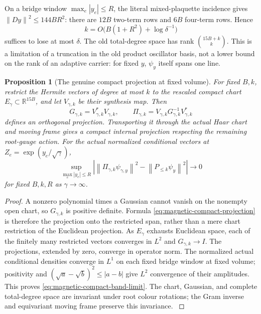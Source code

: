 \documentclass[11pt,oneside,openany]{book}
\newtheorem{proposition}[proposition]{Proposition}
\theoremstyle{definition}
\theoremstyle{remark}
\newcommand{\R}{\mathbb R}
\newcommand{\norm}[1]{\left\lVert#1\right\rVert}
\newcommand{\src}[2]{\cite[#2]{#1}}
\begin{document}
On a bridge window $\max_e|y_e|\le R$, the literal mixed-plaquette
incidence gives $\norm{Dy}^2\le144BR^2$: there are $12B$
two-term rows and $6B$ four-term rows. Hence
\[
 k=O\bigl(B(1+R^2)+\log\delta^{-1}\bigr)
\]
suffices to lose at most $\delta$. The old total-degree space has
rank $\binom{15B+k}{k}$. This is a limitation of a truncation in the
old product oscillator basis, not a lower bound on the rank of an
adaptive carrier: for fixed $y$, $\psi_y$ itself spans one line.

\begin{proposition}[The genuine compact projection at fixed volume]
\label{prop:magnetic-compact-projection}
For fixed $B,k$, restrict the Hermite vectors of degree at most $k$
to the rescaled compact chart $E_\gamma\subset\R^{15B}$, and let
$V_{\gamma,k}$ be their synthesis map. Then
\begin{equation}
 G_{\gamma,k}=V_{\gamma,k}^*V_{\gamma,k},\qquad
 \Pi_{\gamma,k}=V_{\gamma,k}G_{\gamma,k}^{-1}V_{\gamma,k}^*
 \label{eq:magnetic-compact-projection}
\end{equation}
defines an orthogonal projection. Transporting it through the actual
Haar chart and moving frame gives a compact internal projection
respecting the remaining root-gauge action. For the actual normalized
conditional vectors at $Z_e=\exp(y_e/\sqrt\gamma)$,
\begin{equation}
 \sup_{\max_e|y_e|\le R}
 \left|\norm{\Pi_{\gamma,k}\psi_{\gamma,y}}^2
                       -\norm{P_{\le k}\psi_y}^2\right|
                       \longrightarrow0
 \label{eq:magnetic-compact-band-limit}
\end{equation}
for fixed $B,k,R$ as $\gamma\to\infty$.
\end{proposition}
\begin{proof}
A nonzero polynomial times a Gaussian cannot vanish on the nonempty
open chart, so $G_{\gamma,k}$ is positive definite. Formula
\cref{eq:magnetic-compact-projection} is therefore the projection onto
the restricted span, rather than a mere chart restriction of the
Euclidean projection. As $E_\gamma$ exhausts Euclidean space, each
of the finitely many restricted vectors converges in $L^2$ and
$G_{\gamma,k}\to I$. The projections, extended by zero, converge
in operator norm. The normalized actual conditional densities converge
in $L^1$ on each fixed bridge window at fixed volume; positivity and
$(\sqrt a-\sqrt b)^2\le|a-b|$ give $L^2$ convergence of their
amplitudes. This proves \cref{eq:magnetic-compact-band-limit}.
The chart, Gaussian, and complete total-degree space are invariant
under root colour rotations; the Gram inverse and equivariant moving
frame preserve this invariance. \src{F15}{V99--V100}
\end{proof}
\end{document}

